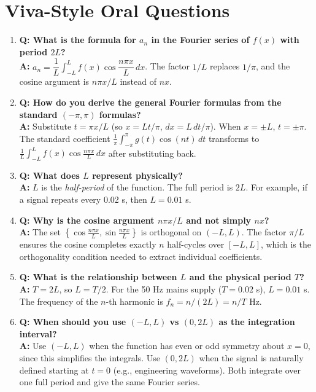 \documentclass[12pt,a4paper]{article}
\begin{document}
\section{Viva-Style Oral Questions}

\begin{enumerate}[leftmargin=*]

\item \textbf{Q: What is the formula for $a_n$ in the Fourier series of $f(x)$ with period $2L$?}\\
\textbf{A:} $a_n = \dfrac{1}{L}\displaystyle\int_{-L}^{L}f(x)\cos\dfrac{n\pi x}{L}\,dx$.
The factor $1/L$ replaces $1/\pi$, and the cosine argument is $n\pi x/L$ instead of $nx$.

\item \textbf{Q: How do you derive the general Fourier formulas from the standard $(-\pi,\pi)$ formulas?}\\
\textbf{A:} Substitute $t = \pi x/L$ (so $x = Lt/\pi$, $dx = L\,dt/\pi$).
When $x = \pm L$, $t = \pm\pi$.
The standard coefficient $\frac{1}{\pi}\int_{-\pi}^{\pi}g(t)\cos(nt)\,dt$ transforms to $\frac{1}{L}\int_{-L}^{L}f(x)\cos\frac{n\pi x}{L}\,dx$ after substituting back.

\item \textbf{Q: What does $L$ represent physically?}\\
\textbf{A:} $L$ is the \emph{half-period} of the function.
The full period is $2L$.
For example, if a signal repeats every 0.02 s, then $L = 0.01$ s.

\item \textbf{Q: Why is the cosine argument $n\pi x/L$ and not simply $nx$?}\\
\textbf{A:} The set $\left\{\cos\frac{n\pi x}{L}, \sin\frac{n\pi x}{L}\right\}$ is orthogonal on $(-L,L)$.
The factor $\pi/L$ ensures the cosine completes exactly $n$ half-cycles over $[-L,L]$, which is the orthogonality condition needed to extract individual coefficients.

\item \textbf{Q: What is the relationship between $L$ and the physical period $T$?}\\
\textbf{A:} $T = 2L$, so $L = T/2$.
For the 50 Hz mains supply ($T = 0.02$ s), $L = 0.01$ s.
The frequency of the $n$-th harmonic is $f_n = n/(2L) = n/T$ Hz.

\item \textbf{Q: When should you use $(-L,L)$ vs $(0,2L)$ as the integration interval?}\\
\textbf{A:} Use $(-L,L)$ when the function has even or odd symmetry about $x=0$, since this simplifies the integrals.
Use $(0,2L)$ when the signal is naturally defined starting at $t=0$ (e.g., engineering waveforms).
Both integrate over one full period and give the same Fourier series.


\end{enumerate}
\end{document}
